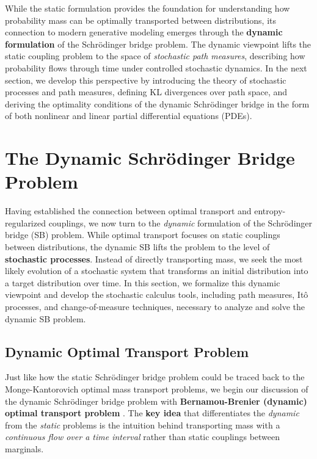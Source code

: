 \documentclass{article}
\newcommand{\boldtext}[1]{\textbf{\textcolor{MyGreen}{#1}}}
\begin{document}
While the static formulation provides the foundation for understanding how probability mass can be optimally transported between distributions, its connection to modern generative modeling emerges through the \textbf{dynamic formulation} of the Schrödinger bridge problem. The dynamic viewpoint lifts the static coupling problem to the space of \textit{stochastic path measures}, describing how probability flows through time under controlled stochastic dynamics. In the next section, we develop this perspective by introducing the theory of stochastic processes and path measures, defining KL divergences over path space, and deriving the optimality conditions of the dynamic Schrödinger bridge in the form of both nonlinear and linear partial differential equations (PDEs).

\newpage
\section{The Dynamic Schrödinger Bridge Problem}
\label{sec:dynamic-sb}
Having established the connection between optimal transport and entropy-regularized couplings, we now turn to the \textit{dynamic} formulation of the Schrödinger bridge (SB) problem. While optimal transport focuses on static couplings between distributions, the dynamic SB lifts the problem to the level of \textbf{stochastic processes}. Instead of directly transporting mass, we seek the most likely evolution of a stochastic system that transforms an initial distribution into a target distribution over time. In this section, we formalize this dynamic viewpoint and develop the stochastic calculus tools, including path measures, Itô processes, and change-of-measure techniques, necessary to analyze and solve the dynamic SB problem.

\subsection{Dynamic Optimal Transport Problem}
\label{subsec:dynamic-ot-problem}
Just like how the static Schrödinger bridge problem could be traced back to the Monge-Kantorovich optimal mass transport problems, we begin our discussion of the dynamic Schrödinger bridge problem with \boldtext{Bernamou-Brenier (dynamic) optimal transport problem} \citep{benamou2000computational}. The \textbf{key idea} that differentiates the \textit{dynamic} from the \textit{static} problems is the intuition behind transporting mass with a \textit{continuous flow over a time interval} rather than static couplings between marginals.
\end{document}
